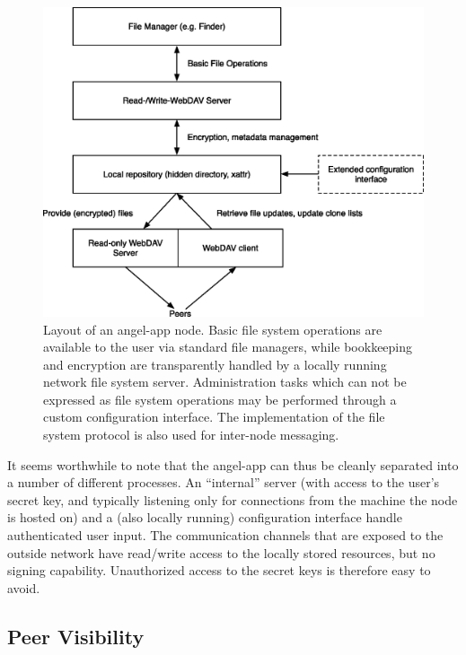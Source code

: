 \documentclass[11pt]{article}
\begin{document}
\begin{mainmatter}
\begin{figure}[ht!]
\begin{center}
\includegraphics[scale=0.7]{figures/eps/webdav.eps}
\end{center}
\caption{Layout of an angel-app node. Basic file system operations are available to the user via standard file managers, while bookkeeping and encryption are transparently handled by a locally running network file system server. Administration tasks which can not be expressed as file system operations may be performed through a custom configuration interface. The implementation of the file system protocol is also used for inter-node messaging.}
\label{webdav}
\end{figure}

It seems worthwhile to note that the angel-app can thus be cleanly separated into a number of different processes. An ``internal'' server (with access to the user's secret key, and typically listening only for connections from the machine the node is hosted on) and a (also locally running) configuration interface handle authenticated user input. The communication channels that are exposed to the outside network have read/write access to the locally stored resources, but no signing capability. Unauthorized access to the secret keys is therefore easy to avoid.


\newpage
\subsection{Peer Visibility}


\end{mainmatter}
\end{document}
